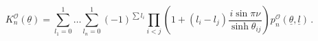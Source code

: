 \begin{equation}
K_{n}^{\mathcal{O}}(\underline{\theta})=\sum_{l_{1}=0}^{1}\dots\sum_{l_{n}%
=0}^{1}(-1)^{\sum l_{i}}\prod_{i<j}\!\left(  1+(l_{i}-l_{j})\frac{i\sin\pi\nu
}{\sinh\theta_{ij}}\right)  \!p_{n}^{\mathcal{O}}(\underline{\theta
},\underline{l})\,.\label{3}%
\end{equation}

